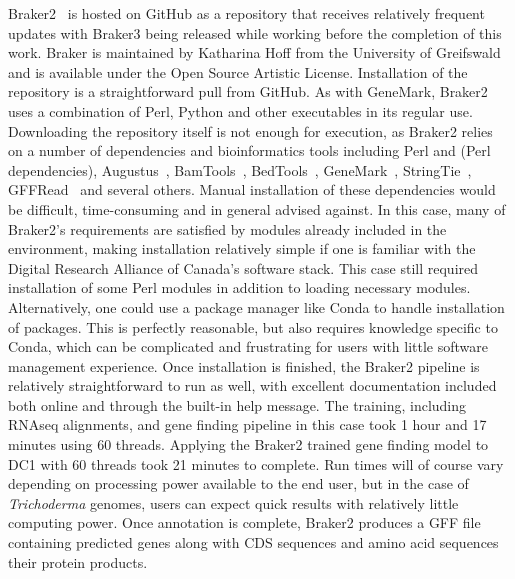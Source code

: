 
Braker2~\cite{bruna2021a} is hosted on GitHub as a repository that
receives relatively frequent updates with Braker3 being released while
working before the completion of this work. Braker is maintained by
Katharina Hoff from the University of Greifswald and is available
under the Open Source Artistic License. Installation of the repository
is a straightforward pull from GitHub. As with GeneMark, Braker2 uses
a combination of Perl, Python and other executables in its regular
use. Downloading the repository itself is not enough for execution, as
Braker2 relies on a number of dependencies and bioinformatics tools
including Perl and (Perl dependencies), Augustus~\cite{stanke2006a},
BamTools~\cite{barnett2011a},
BedTools~\cite{quinlan2010},
GeneMark~\cite{borodovsky2011a}, StringTie~\cite{pertea2015a},
GFFRead~\cite{pertea2020a} and several others. Manual installation of
these dependencies would be difficult, time-consuming and in general
advised against. In this case, many of Braker2's requirements are
satisfied by modules already included in the environment, making
installation relatively simple if one is familiar with the Digital
Research Alliance of Canada's software stack. This case still required
installation of some Perl modules in addition to loading necessary
modules. Alternatively, one could use a package manager like Conda to
handle installation of packages. This is perfectly reasonable, but
also requires knowledge specific to Conda, which can be complicated
and frustrating for users with little software management
experience. Once installation is finished, the Braker2 pipeline is
relatively straightforward to run as well, with excellent
documentation included both online and through the built-in help
message. The training, including RNAseq alignments, and gene finding
pipeline in this case took 1 hour and 17 minutes using 60
threads. Applying the Braker2 trained gene finding model to DC1 with
60 threads took 21 minutes to complete. Run times will of course vary
depending on processing power available to the end user, but in the
case of \textit{Trichoderma} genomes, users can expect quick results
with relatively little computing power. Once annotation is complete,
Braker2 produces a GFF file containing predicted genes along with CDS
sequences and amino acid sequences their protein products.


